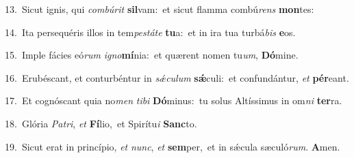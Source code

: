 {\numbfont\textcolor{\numbcolor}{13.}}~Sicut ignis, qui \textit{com}\-\textit{bú}\textit{rit} \textbf{sil}\-vam:~\star et sicut flamma combú\textit{rens} \textbf{mon}\-tes:\par
{\numbfont\textcolor{\numbcolor}{14.}}~Ita persequéris illos in tem\-\textit{pes}\-\textit{tá}\textit{te} \textbf{tu}\-a:~\star et in ira tua turbá\textit{bis} \textbf{e}\-os.\par
{\numbfont\textcolor{\numbcolor}{15.}}~Imple fácies eó\textit{rum} \textit{i}\-\textit{gno}\textbf{mí}nia:~\star et quærent nomen tu\-\textit{um}\-, \textbf{Dó}\-mine.\par
{\numbfont\textcolor{\numbcolor}{16.}}~Erubéscant, et conturbéntur in \textit{sǽ}\-\textit{cu}\textit{lum} \textbf{sǽ}\-culi:~\star et confundántur, \textit{et} \textbf{pér}\-eant.\par
{\numbfont\textcolor{\numbcolor}{17.}}~Et cognóscant quia no\textit{men} \textit{ti}\-\textit{bi} \textbf{Dó}\-minus:~\star tu solus Altíssimus in om\textit{ni} \textbf{ter}\-ra.\par
{\numbfont\textcolor{\numbcolor}{18.}}~Glória \textit{Pa}\-\textit{tri}, \textit{et} \textbf{Fí}\-lio,~\star et Spirítu\textit{i} \textbf{Sanc}\-to.\par
{\numbfont\textcolor{\numbcolor}{19.}}~Sicut erat in princípio, \textit{et} \textit{nunc}\-, \textit{et} \textbf{sem}\-per,~\star et in sǽcula sæculó\-\textit{rum}\-. \textbf{A}\-men.\par
